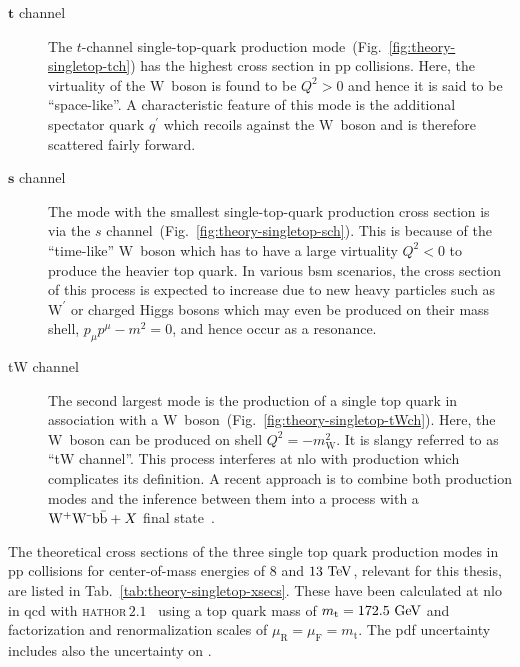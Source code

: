\begin{description}
\item[$\boldsymbol{t}$ channel] The $t$-channel single-top-quark production mode~(Fig.~\ref{fig:theory-singletop-tch}) has the highest cross section in $\mathrm{pp}$ collisions. Here, the virtuality of the $\mathrm{W}$~boson is found to be $Q^2>0$ and hence it is said to be ``space-like''. A characteristic feature of this mode is the additional spectator quark $q^\prime$ which recoils against the $\mathrm{W}$~boson and is therefore scattered fairly forward. 
\item[$\boldsymbol{s}$ channel] The mode with the smallest single-top-quark production cross section is via the $s$ channel~(Fig.~\ref{fig:theory-singletop-sch}). This is because of the ``time-like'' $\mathrm{W}$~boson which has to have a large virtuality $Q^2<0$ to produce the heavier top quark. In various \gls{bsm} scenarios, the cross section of this process is expected to increase due to new heavy particles such as $\mathrm{W}^\prime$ or charged Higgs bosons which may even be produced on their mass shell, $p_{\mu}p^{\mu}-m^{2}=0$, and hence occur as a resonance.
\item[tW channel] The second largest mode is the production of a single top quark in association with a $\mathrm{W}$~boson~(Fig.~\ref{fig:theory-singletop-tWch}). Here, the $\mathrm{W}$~boson can be produced on shell $Q^2=-m_\mathrm{W}^{2}$. It is slangy referred to as ``tW channel''. This process interferes at \gls{nlo} with \ttbar production which complicates its definition. A recent approach is to combine both production modes and the inference between them into a process with a $\mathrm{W}^{\rmplus}\mathrm{W}^{\rmminus}\mathrm{b}\bar{\mathrm{b}}+X$ final state~\cite{Cascioli:2013wga}.
\end{description}

The theoretical cross sections of the three single top quark production modes in pp collisions for center-of-mass energies of $8$ and $13~\mathrm{TeV}$, relevant for this thesis, are listed in Tab.~\ref{tab:theory-singletop-xsecs}. These have been calculated at \gls{nlo} in \gls{qcd} with \textsc{\gls{hathor}}\,$2.1$~\cite{Aliev:2010zk,Kant:2014oha} using a top quark mass of $m_\mathrm{t}=172.5~\mathrm{GeV}$ and factorization and renormalization scales of $\mu_\mathrm{R}=\mu_\mathrm{F}=m_\mathrm{t}$. The \gls{pdf} uncertainty includes also the uncertainty on \as.

